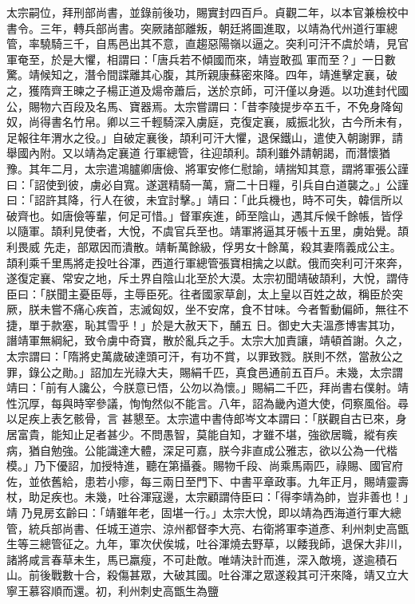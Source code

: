 \begin{pinyinscope}
 太宗嗣位，拜刑部尚書，並錄前後功，賜實封四百戶。貞觀二年，以本官兼檢校中書令。三年，轉兵部尚書。突厥諸部離叛，朝廷將圖進取，以靖為代州道行軍總管，率驍騎三千，自馬邑出其不意，直趨惡陽嶺以逼之。突利可汗不虞於靖，見官軍奄至，於是大懼，相謂曰：「唐兵若不傾國而來，靖豈敢孤
 軍而至？」一日數驚。靖候知之，潛令間諜離其心腹，其所親康蘇密來降。四年，靖進擊定襄，破之，獲隋齊王暕之子楊正道及煬帝蕭后，送於京師，可汗僅以身遁。以功進封代國公，賜物六百段及名馬、寶器焉。太宗嘗謂曰：「昔李陵提步卒五千，不免身降匈奴，尚得書名竹帛。卿以三千輕騎深入虜庭，克復定襄，威振北狄，古今所未有，足報往年渭水之役。」自破定襄後，頡利可汗大懼，退保鐵山，遣使入朝謝罪，請舉國內附。又以靖為定襄道
 行軍總管，往迎頡利。頡利雖外請朝謁，而潛懷猶豫。其年二月，太宗遣鴻臚卿唐儉、將軍安修仁慰諭，靖揣知其意，謂將軍張公謹曰：「詔使到彼，虜必自寬。遂選精騎一萬，齎二十日糧，引兵自白道襲之。」公謹曰：「詔許其降，行人在彼，未宜討擊。」靖曰：「此兵機也，時不可失，韓信所以破齊也。如唐儉等輩，何足可惜。」督軍疾進，師至陰山，遇其斥候千餘帳，皆俘以隨軍。頡利見使者，大悅，不虞官兵至也。靖軍將逼其牙帳十五里，虜始覺。頡利畏威
 先走，部眾因而潰散。靖斬萬餘級，俘男女十餘萬，殺其妻隋義成公主。頡利乘千里馬將走投吐谷渾，西道行軍總管張寶相擒之以獻。俄而突利可汗來奔，遂復定襄、常安之地，斥土界自陰山北至於大漠。太宗初聞靖破頡利，大悅，謂侍臣曰：「朕聞主憂臣辱，主辱臣死。往者國家草創，太上皇以百姓之故，稱臣於突厥，朕未嘗不痛心疾首，志滅匈奴，坐不安席，食不甘味。今者暫動偏師，無往不捷，單于款塞，恥其雪乎！」於是大赦天下，酺五
 日。御史大夫溫彥博害其功，譖靖軍無綱紀，致令虜中奇寶，散於亂兵之手。太宗大加責讓，靖頓首謝。久之，太宗謂曰：「隋將史萬歲破達頭可汗，有功不賞，以罪致戮。朕則不然，當赦公之罪，錄公之勛。」詔加左光祿大夫，賜絹千匹，真食邑通前五百戶。未幾，太宗謂靖曰：「前有人讒公，今朕意已悟，公勿以為懷。」賜絹二千匹，拜尚書右僕射。靖性沉厚，每與時宰參議，恂恂然似不能言。八年，詔為畿內道大使，伺察風俗。尋以足疾上表乞骸骨，言
 甚懇至。太宗遣中書侍郎岑文本謂曰：「朕觀自古已來，身居富貴，能知止足者甚少。不問愚智，莫能自知，才雖不堪，強欲居職，縱有疾病，猶自勉強。公能識達大體，深足可嘉，朕今非直成公雅志，欲以公為一代楷模。」乃下優詔，加授特進，聽在第攝養。賜物千段、尚乘馬兩匹，祿賜、國官府佐，並依舊給，患若小瘳，每三兩日至門下、中書平章政事。九年正月，賜靖靈壽杖，助足疾也。未幾，吐谷渾寇邊，太宗顧謂侍臣曰：「得李靖為帥，豈非善也！」靖
 乃見房玄齡曰：「靖雖年老，固堪一行。」太宗大悅，即以靖為西海道行軍大總管，統兵部尚書、任城王道宗、涼州都督李大亮、右衛將軍李道彥、利州刺史高甑生等三總管征之。九年，軍次伏俟城，吐谷渾燒去野草，以餧我師，退保大非川，諸將咸言春草未生，馬已羸瘦，不可赴敵。唯靖決計而進，深入敵境，遂逾積石山。前後戰數十合，殺傷甚眾，大破其國。吐谷渾之眾遂殺其可汗來降，靖又立大寧王慕容順而還。初，利州刺史高甑生為鹽

\end{pinyinscope}
